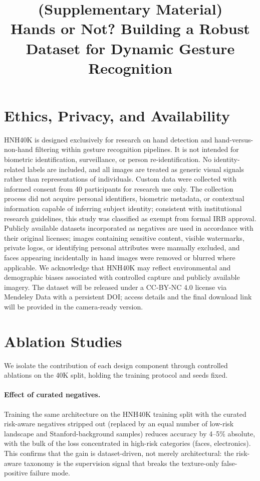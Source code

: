 \documentclass{bmvc2k}
\title{(Supplementary Material) \\Hands or Not? Building a Robust Dataset for Dynamic Gesture Recognition}
\begin{document}
\maketitle

\section{Ethics, Privacy, and Availability}
\label{sec:ethics}

HNH40K is designed exclusively for research on hand detection and hand-versus-non-hand filtering within gesture recognition pipelines. It is not intended for biometric identification, surveillance, or person re-identification. No identity-related labels are included, and all images are treated as generic visual signals rather than representations of individuals. Custom data were collected with informed consent from 40 participants for research use only. The collection process did not acquire personal identifiers, biometric metadata, or contextual information capable of inferring subject identity; consistent with institutional research guidelines, this study was classified as exempt from formal IRB approval. Publicly available datasets incorporated as negatives are used in accordance with their original licenses; images containing sensitive content, visible watermarks, private logos, or identifying personal attributes were manually excluded, and faces appearing incidentally in hand images were removed or blurred where applicable. We acknowledge that HNH40K may reflect environmental and demographic biases associated with controlled capture and publicly available imagery. The dataset will be released under a CC-BY-NC 4.0 license via Mendeley Data with a persistent DOI; access details and the final download link will be provided in the camera-ready version.

\section{Ablation Studies}

We isolate the contribution of each design component through controlled ablations on the 40K split, holding the training protocol and seeds fixed.

\paragraph{Effect of curated negatives.} Training the same architecture on the HNH40K training split with the curated risk-aware negatives stripped out (replaced by an equal number of low-risk landscape and Stanford-background samples) reduces accuracy by 4--5\% absolute, with the bulk of the loss concentrated in high-risk categories (faces, electronics). This confirms that the gain is dataset-driven, not merely architectural: the risk-aware taxonomy is the supervision signal that breaks the texture-only false-positive failure mode.
\end{document}
